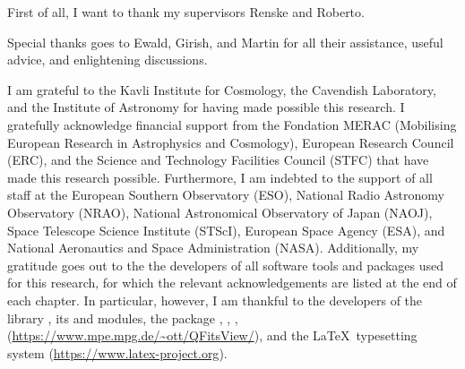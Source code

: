 
\begin{acknowledgements}      
    
    First of all, I want to thank my supervisors Renske and Roberto.
    
    Special thanks goes to Ewald, Girish, and Martin for all their assistance, useful advice, and enlightening discussions.
    
    I am grateful to the Kavli Institute for Cosmology, the Cavendish Laboratory, and the Institute of Astronomy for having made possible this research. I gratefully acknowledge financial support from the Fondation MERAC (Mobilising European Research in Astrophysics and Cosmology), European Research Council (ERC), and the Science and Technology Facilities Council (STFC) that have made this research possible. Furthermore, I am indebted to the support of all staff at the European Southern Observatory (ESO), National Radio Astronomy Observatory (NRAO), National Astronomical Observatory of Japan (NAOJ), Space Telescope Science Institute (STScI), European Space Agency (ESA), and National Aeronautics and Space Administration (NASA). Additionally, my gratitude goes out to the the developers of all software tools and packages used for this research, for which the relevant acknowledgements are listed at the end of each chapter. In particular, however, I am thankful to the developers of the  library \citep{Jones2001}, its  \citep{2011CSE....13b..22V} and  \citep{Hunter2007} modules, the  package \citep{2013A&A...558A..33A, 2018AJ....156..123A},  \citep{2003ASPC..295..489J},  \citep[Tool for OPerations on Catalogues And Tables;][]{2005ASPC..347...29T},  (\url{https://www.mpe.mpg.de/~ott/QFitsView/}), and the \LaTeX\ typesetting system (\url{https://www.latex-project.org}).
    
\end{acknowledgements}
